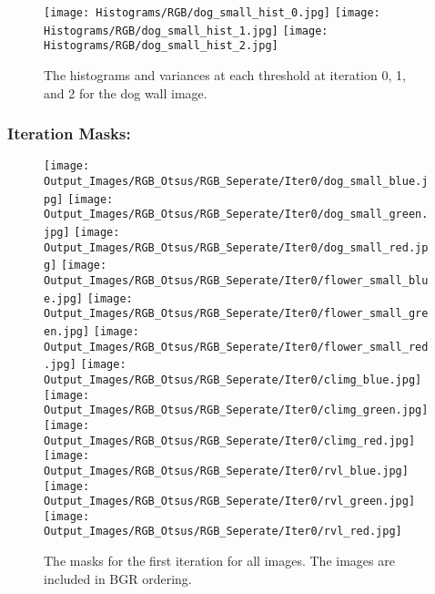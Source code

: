 \documentclass{article}
\begin{document}
\begin{figure}[H]
    \centering
    \texttt{[image: Histograms/RGB/dog\_small\_hist\_0.jpg]}
    \texttt{[image: Histograms/RGB/dog\_small\_hist\_1.jpg]}
    \texttt{[image: Histograms/RGB/dog\_small\_hist\_2.jpg]}
    \caption{The histograms and variances at each threshold at iteration 0, 1, and 2 for the dog wall image.}
\end{figure}

\subsubsection{Iteration Masks:}
\begin{figure}[H]
    \centering
    \texttt{[image: Output\_Images/RGB\_Otsus/RGB\_Seperate/Iter0/dog\_small\_blue.jpg]}
    \texttt{[image: Output\_Images/RGB\_Otsus/RGB\_Seperate/Iter0/dog\_small\_green.jpg]}
    \texttt{[image: Output\_Images/RGB\_Otsus/RGB\_Seperate/Iter0/dog\_small\_red.jpg]}
    \texttt{[image: Output\_Images/RGB\_Otsus/RGB\_Seperate/Iter0/flower\_small\_blue.jpg]}
    \texttt{[image: Output\_Images/RGB\_Otsus/RGB\_Seperate/Iter0/flower\_small\_green.jpg]}
    \texttt{[image: Output\_Images/RGB\_Otsus/RGB\_Seperate/Iter0/flower\_small\_red.jpg]}
    \texttt{[image: Output\_Images/RGB\_Otsus/RGB\_Seperate/Iter0/climg\_blue.jpg]}
    \texttt{[image: Output\_Images/RGB\_Otsus/RGB\_Seperate/Iter0/climg\_green.jpg]}
    \texttt{[image: Output\_Images/RGB\_Otsus/RGB\_Seperate/Iter0/climg\_red.jpg]}
    \texttt{[image: Output\_Images/RGB\_Otsus/RGB\_Seperate/Iter0/rvl\_blue.jpg]}
    \texttt{[image: Output\_Images/RGB\_Otsus/RGB\_Seperate/Iter0/rvl\_green.jpg]}
    \texttt{[image: Output\_Images/RGB\_Otsus/RGB\_Seperate/Iter0/rvl\_red.jpg]}
    \caption{The masks for the first iteration for all images. The images are included in BGR ordering.}
\end{figure}
\end{document}
